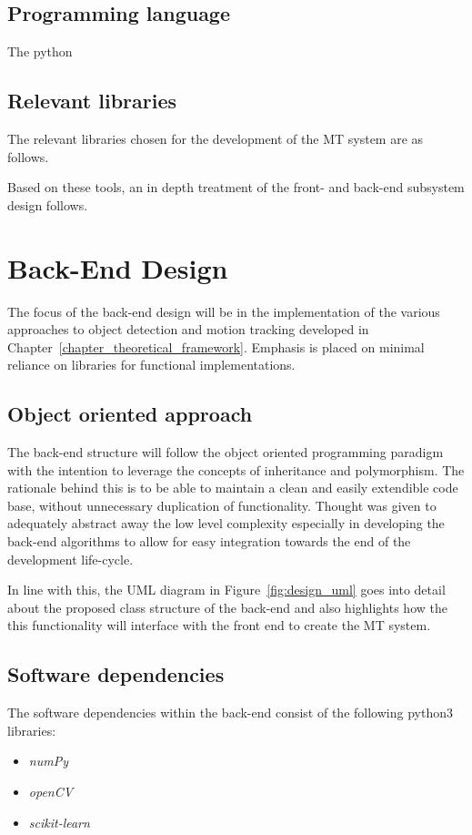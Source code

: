 \subsection{Programming language}
The python 

\subsection{Relevant libraries}
The relevant libraries chosen for the development of the MT system are as
follows.




Based on these tools, an in depth treatment of the front- and back-end subsystem
design follows. 

\section{Back-End Design}\label{design_back_end}
The focus of the back-end design will be in the implementation of the various
approaches to object detection and motion tracking developed in
Chapter~\ref{chapter_theoretical_framework}.
Emphasis is placed on minimal reliance on libraries for functional
implementations.

\subsection{Object oriented approach}
The back-end structure will follow the object oriented programming paradigm with
the intention to leverage the concepts of inheritance and polymorphism. The
rationale behind this is to be able to maintain a clean and easily extendible
code base, without unnecessary duplication of functionality. Thought was given
to adequately abstract away the low level complexity especially in developing
the back-end algorithms to allow for easy integration towards the end of the
development life-cycle. 

In line with this, the UML diagram in Figure~\ref{fig:design_uml} goes into
detail about the proposed class structure of the back-end and also highlights how the 
this functionality will interface with the front end to create the MT system.


\subsection{Software dependencies}
The software dependencies within the back-end consist of the following python3
libraries:
\begin{itemize}
    \item \textit{numPy}
    \item \textit{openCV}
    \item \textit{scikit-learn}
\end{itemize}

